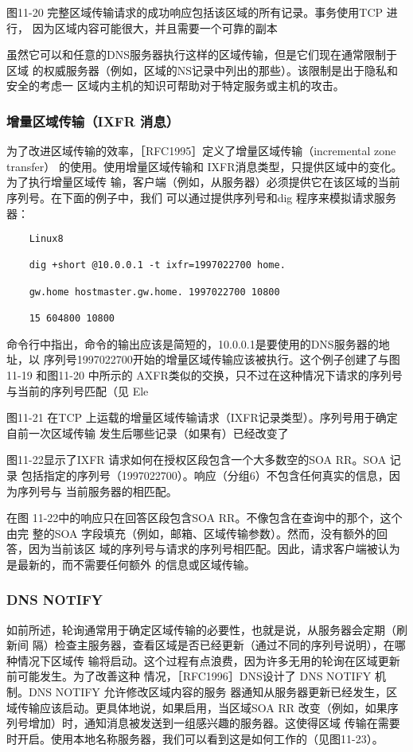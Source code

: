 图11-20
完整区域传输请求的成功响应包括该区域的所有记录。事务使用TCP 进行，
因为区域内容可能很大，并且需要一个可靠的副本

虽然它可以和任意的DNS服务器执行这样的区域传输，但是它们现在通常限制于区域
的权威服务器（例如，区域的NS记录中列出的那些）。该限制是出于隐私和安全的考虑一
区域内主机的知识可帮助对于特定服务或主机的攻击。

\subsubsection{增量区域传输（IXFR 消息）}

为了改进区域传输的效率，［RFC1995］定义了增量区域传输（incremental zone transfer）
的使用。使用增量区域传输和 IXFR消息类型，只提供区域中的变化。为了执行增量区域传
输，客户端（例如，从服务器）必须提供它在该区域的当前序列号。在下面的例子中，我们
可以通过提供序列号和dig 程序来模拟请求服务器：

\begin{verbatim}
    Linux8
    
    dig +short @10.0.0.1 -t ixfr=1997022700 home.
    
    gw.home hostmaster.gw.home. 1997022700 10800
    
    15 604800 10800
\end{verbatim}

命令行中指出，命令的输出应该是简短的，10.0.0.1是要使用的DNS服务器的地址，以
序列号1997022700开始的增量区域传输应该被执行。这个例子创建了与图11-19 和图11-20
中所示的 AXFR类似的交换，只不过在这种情况下请求的序列号与当前的序列号匹配（见
Ele

图11-21
在TCP 上运载的增量区域传输请求（IXFR记录类型）。序列号用于确定自前一次区域传输
发生后哪些记录（如果有）已经改变了

图11-22显示了IXFR 请求如何在授权区段包含一个大多数空的SOA RR。SOA 记录
包括指定的序列号（1997022700）。响应（分组6）不包含任何真实的信息，因为序列号与
当前服务器的相匹配。

在图 11-22中的响应只在回答区段包含SOA RR。不像包含在查询中的那个，这个由完
整的SOA 字段填充（例如，邮箱、区域传输参数）。然而，没有额外的回答，因为当前该区
域的序列号与请求的序列号相匹配。因此，请求客户端被认为是最新的，而不需要任何额外
的信息或区域传输。

\subsubsection{DNS NOTIFY}

如前所述，轮询通常用于确定区域传输的必要性，也就是说，从服务器会定期（刷新间
隔）检查主服务器，查看区域是否已经更新（通过不同的序列号说明），在哪种情况下区域传
输将启动。这个过程有点浪费，因为许多无用的轮询在区域更新前可能发生。为了改善这种
情况，［RFC1996］DNS设计了 DNS NOTIFY 机制。DNS NOTIFY 允许修改区域内容的服务
器通知从服务器更新已经发生，区域传输应该启动。更具体地说，如果启用，当区域SOA
RR 改变（例如，如果序列号增加）时，通知消息被发送到一组感兴趣的服务器。这使得区域
传输在需要时开启。使用本地名称服务器，我们可以看到这是如何工作的（见图11-23）。

